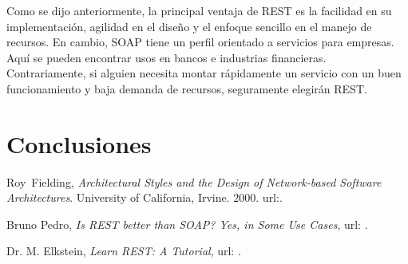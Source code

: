\documentclass[conference]{IEEEtran}
\begin{document}
Como se dijo anteriormente, la principal ventaja de REST es la
facilidad en su implementación, agilidad en el diseño y el enfoque
sencillo en el manejo de recursos. En cambio, SOAP tiene un perfil
orientado a servicios para empresas. Aquí se pueden encontrar usos en
bancos e industrias financieras. Contrariamente, si alguien necesita
montar rápidamente un servicio con un buen funcionamiento y baja
demanda de recursos, seguramente elegirán REST.

\section{Conclusiones}
\label{sec:con}
\lipsum[1]
\begin{thebibliography}{1}


  Roy~Fielding, \emph{Architectural Styles and the Design of
    Network-based Software Architectures}. University of California,
  Irvine. 2000. url:\texttt{}.

Bruno Pedro, \emph{Is REST better than SOAP? Yes, in Some Use Cases},
url:
\texttt{}.

  Dr. M. Elkstein, \emph{Learn REST: A Tutorial},
url: \texttt{}.




\end{thebibliography}

\end{document}
